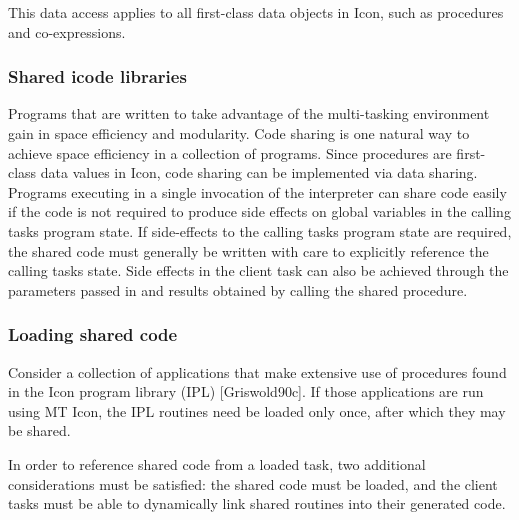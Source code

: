
This data access applies to all first-class data objects in Icon, such
as procedures and co-expressions. 

\subsubsection{Shared icode libraries}

Programs that are written to take advantage of the multi-tasking
environment gain in space efficiency and modularity. Code sharing is
one natural way to achieve space efficiency in a collection of
programs. Since procedures are first-class data values in Icon, code
sharing can be implemented via data sharing. Programs executing in a
single invocation of the interpreter can share code easily if the code
is not required to produce side effects on global variables in the
calling task{\textquotesingle}s program state. If side-effects to the
calling task{\textquotesingle}s program state are required, the shared
code must generally be written with care to explicitly reference the
calling task{\textquotesingle}s state. Side effects in the client task
can also be achieved through the parameters passed in and results
obtained by calling the shared procedure. 

\subsubsection{Loading shared code}

Consider a collection of applications that make extensive use of
procedures found in the Icon program library (IPL) [Griswold90c]. If
those applications are run using MT Icon, the IPL routines need be
loaded only once, after which they may be shared.

In order to reference shared code from a loaded task, two additional
considerations must be satisfied: the shared code must be loaded, and
the client tasks must be able to dynamically link shared routines into
their generated code.


